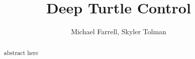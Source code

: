 \documentclass[letterpaper, 10 pt, conference]{ieeeconf}  %
\title{\LARGE \bf
Deep Turtle Control
}
\author{Michael Farrell, Skyler Tolman}
\begin{document}
\maketitle
\thispagestyle{empty}
\pagestyle{empty}

\begin{abstract}
    abstract here
\end{abstract}













\end{document}
